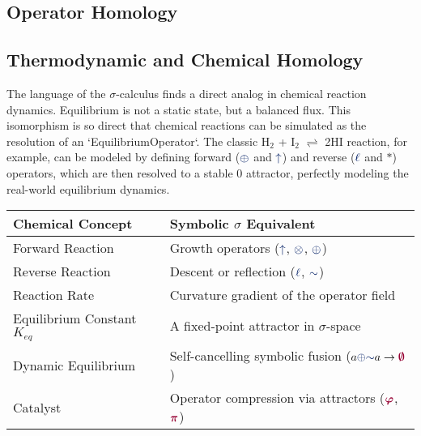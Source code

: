 \subsection{Operator Homology}

\subsection{Thermodynamic and Chemical Homology}
The language of the $\sigma$-calculus finds a direct analog in chemical reaction dynamics. Equilibrium is not a static state, but a balanced flux. This isomorphism is so direct that chemical reactions can be simulated as the resolution of an `EquilibriumOperator`. The classic H$_2$ + I$_2$ $\rightleftharpoons$ 2HI reaction, for example, can be modeled by defining forward ($\fuse$ and $\grow$) and reverse ($\lha$ and $*$) operators, which are then resolved to a stable $0$ attractor, perfectly modeling the real-world equilibrium dynamics.

\begin{center}
\renewcommand{\arraystretch}{1.2}
\begin{tabular}{l l}
\hline
\textbf{Chemical Concept} & \textbf{Symbolic $\sigma$ Equivalent} \\
\hline
Forward Reaction & Growth operators ($\grow$, $\tensor$, $\fuse$) \\
Reverse Reaction & Descent or reflection ($\lha$, $\reflec$) \\
Reaction Rate & Curvature gradient of the operator field \\
Equilibrium Constant $K_{eq}$ & A fixed-point attractor in $\sigma$-space \\
Dynamic Equilibrium & Self-cancelling symbolic fusion ($a \fuse \reflec a \to \void$) \\
Catalyst & Operator compression via attractors ($\gold$, $\pirot$) \\
\hline
\end{tabular}
\end{center}

